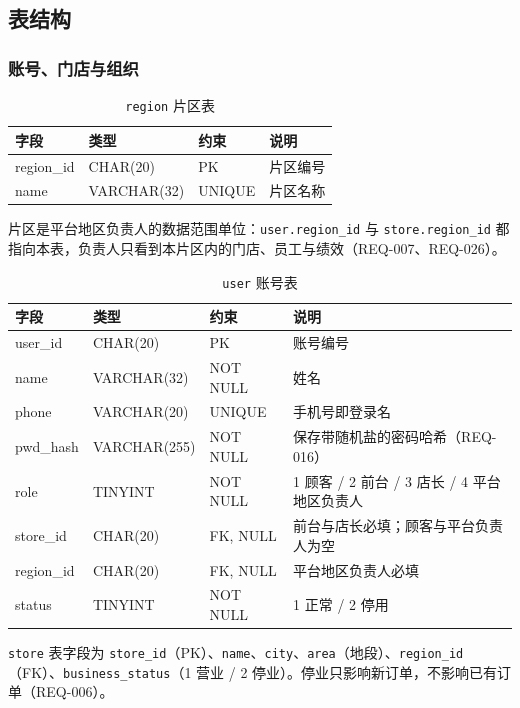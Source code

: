 \subsection{表结构}

\subsubsection{账号、门店与组织}

\begin{table}[H]
\centering
\caption{\texttt{region} 片区表}
\tabfont
\begin{tabularx}{\textwidth}{@{}L{2.7cm}L{2.9cm}L{2.6cm}X@{}}
\toprule
字段 & 类型 & 约束 & 说明 \\
\midrule
region\_id & CHAR(20) & PK & 片区编号 \\
name & VARCHAR(32) & UNIQUE & 片区名称 \\
\bottomrule
\end{tabularx}
\end{table}

片区是平台地区负责人的数据范围单位：\texttt{user.region\_id} 与 \texttt{store.region\_id} 都指向本表，负责人只看到本片区内的门店、员工与绩效（REQ-007、REQ-026）。

\begin{table}[H]
\centering
\caption{\texttt{user} 账号表}
\tabfont
\begin{tabularx}{\textwidth}{@{}L{2.7cm}L{2.9cm}L{2.6cm}X@{}}
\toprule
字段 & 类型 & 约束 & 说明 \\
\midrule
user\_id & CHAR(20) & PK & 账号编号 \\
name & VARCHAR(32) & NOT NULL & 姓名 \\
phone & VARCHAR(20) & UNIQUE & 手机号即登录名 \\
pwd\_hash & VARCHAR(255) & NOT NULL & 保存带随机盐的密码哈希（REQ-016） \\
role & TINYINT & NOT NULL & 1 顾客 / 2 前台 / 3 店长 / 4 平台地区负责人 \\
store\_id & CHAR(20) & FK, NULL & 前台与店长必填；顾客与平台负责人为空 \\
region\_id & CHAR(20) & FK, NULL & 平台地区负责人必填 \\
status & TINYINT & NOT NULL & 1 正常 / 2 停用 \\
\bottomrule
\end{tabularx}
\end{table}

\texttt{store} 表字段为 \texttt{store\_id}（PK）、\texttt{name}、\texttt{city}、\texttt{area}（地段）、\texttt{region\_id}（FK）、\texttt{business\_status}（1 营业 / 2 停业）。停业只影响新订单，不影响已有订单（REQ-006）。

